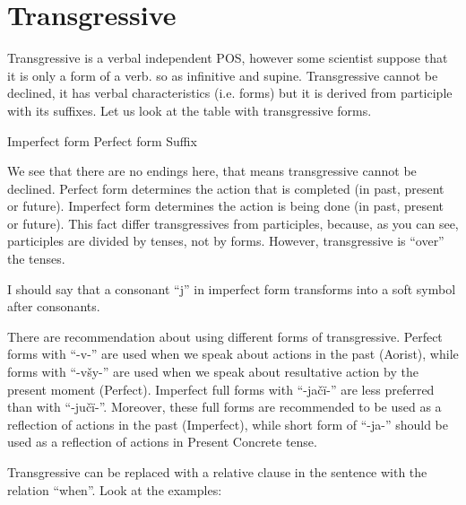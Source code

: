 \section{Transgressive}

Transgressive is a verbal independent POS, however some scientist suppose that it is only a form of a verb. so as infinitive and supine.
Transgressive cannot be declined, it has verbal characteristics (i.e. forms) but it is derived from participle with its suffixes. Let us look at the table with transgressive forms.

Imperfect form
Perfect form
Suffix

We see that there are no endings here, that means transgressive cannot be declined. Perfect form determines the action that is completed (in past, present or future). Imperfect form determines the action is being done (in past, present or future). This fact differ transgressives from participles, because, as you can see, participles are divided by tenses, not by forms. However, transgressive is “over” the tenses. 

I should say that a consonant “j” in imperfect form transforms into a soft symbol after consonants. 

There are recommendation about using different forms of transgressive. Perfect forms with “-v-” are used when we speak about actions in the past (Aorist), while forms with “-všy-” are used when we speak about resultative action by the present moment (Perfect). Imperfect full forms with “-jačï-” are less preferred than with “-jučï-”. Moreover, these full forms are recommended to be used as a reflection of actions in the past (Imperfect), while short form of “-ja-” should be used as a reflection of actions in Present Concrete tense.

Transgressive can be replaced with a relative clause in the sentence with the relation “when”. Look at the examples:
